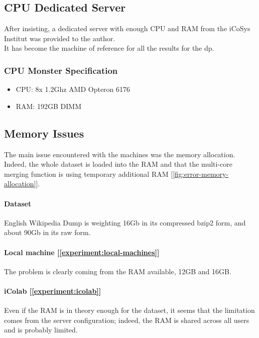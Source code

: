 \subsection{CPU Dedicated Server}
\label{experiment:cpu-monster}
After insisting, a dedicated server with enough CPU and RAM from the iCoSys Institut was provided to the author.\\

It has become the machine of reference for all the results for the \gls{dp}.

\subsubsection{CPU Monster Specification}
\begin{itemize}
    \setlength\itemsep{0em}
    \item CPU: 8x 1.2Ghz AMD Opteron 6176
    \item RAM: 192GB DIMM
\end{itemize}


\subsection{Memory Issues}
\label{experiment:memory-issues}
The main issue encountered with the machines was the memory allocation. Indeed, the whole dataset is loaded into the RAM and that the multi-core merging function is using temporary additional RAM [\ref{fig:error-memory-allocation}].\\

\paragraph{Dataset}
English Wikipedia Dump is weighting 16Gb in its compressed bzip2 form, and about 90Gb in its raw form.\\

\paragraph{Local machine [\ref{experiment:local-machines}]}
The problem is clearly coming from the RAM available, 12GB and 16GB.

\paragraph{iColab [\ref{experiment:icolab}]}
Even if the RAM is in theory enough for the dataset, it seems that the limitation comes from the server configuration; indeed, the RAM is shared across all users and is probably limited.

